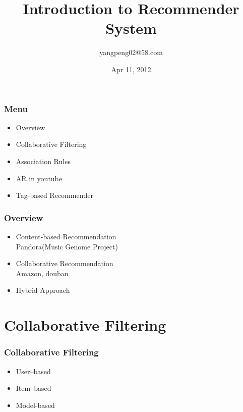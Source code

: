 \documentclass{beamer}
\title[Introduction to Recommender System]{Introduction to Recommender System}
\institute[]{}
\author{yangpeng02@58.com}
\date{Apr 11, 2012}
\begin{document}
\begin{frame}
  \titlepage
\end{frame}





\begin{frame}
  \frametitle{Menu}
  \begin{itemize}

  \item Overview
  \item Collaborative Filtering

  \item Association Rules
  \item AR in youtube

  \item Tag-based Recommender

  \end{itemize}
\end{frame}




\begin{frame}
  \frametitle{Overview}
  \begin{itemize}
  \item Content-based Recommendation \\
    Pandora(Music Genome Project)
  \item Collaborative Recommendation \\
    Amazon, douban
  \item Hybrid Approach
  \end{itemize}
\end{frame}



\section[CF]{Collaborative Filtering}

\begin{frame}
  \frametitle{Collaborative Filtering}
  \begin{itemize}
  \item User–based
  \item Item–based
  \item Model-based

  \end{itemize}
\end{frame}
\end{document}
